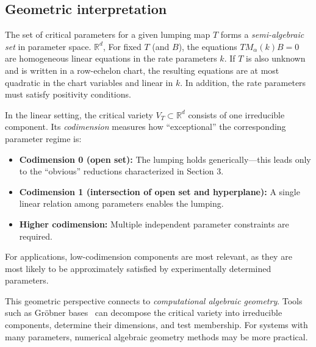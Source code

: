 \documentclass{article}
\begin{document}
\subsection{Geometric interpretation}
The set of critical parameters for a given lumping map $T$ forms a \emph{semi-algebraic set} in 
parameter space. $\mathbb{R}^d$, 
For fixed $T$ (and $B$), the equations $T M_\alpha(k)B=0$ are homogeneous linear equations in the rate parameters $k$.  If $T$ is also unknown and is written in a row-echelon chart, the resulting equations are at most quadratic in the chart variables and linear in $k$.
In addition, the rate parameters must satisfy positivity conditions.

In the linear setting, the critical variety $V_T \subset \mathbb{R}^d$ consists of one irreducible component. Its \emph{codimension} measures how ``exceptional'' 
the corresponding parameter regime is:
\begin{itemize}
    \item {\bf Codimension 0 (open set):} The lumping holds generically---this leads only 
    to the ``obvious'' reductions characterized in Section 3.
    \item {\bf Codimension 1 (intersection of open set and hyperplane):} A single linear relation among parameters 
    enables the lumping.
    \item {\bf Higher codimension:} Multiple independent parameter constraints are required.
\end{itemize}


For applications, low-codimension components are most relevant, as they are most likely to be approximately satisfied by experimentally 
determined parameters.


This geometric perspective connects to \emph{computational algebraic geometry}. Tools such 
as Gr\"obner bases~\cite{CLOS} can decompose the critical variety into irreducible 
components, determine their dimensions, and test membership. For systems with many 
parameters, numerical algebraic geometry methods may be more practical.

\end{document}
